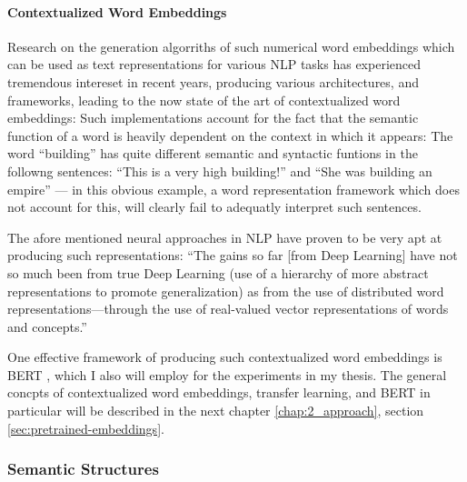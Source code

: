 \paragraph*{Contextualized Word Embeddings}

Research on the generation algorriths of such numerical word embeddings which can
be used as text representations for various NLP tasks has experienced tremendous
intereset in recent years, producing various architectures, and frameworks, leading
to the now state of the art of contextualized word embeddings: Such implementations
account for the fact that the semantic function of a word is heavily dependent on
the context in which it appears: The word ``building'' has quite different semantic
and syntactic funtions in the followng sentences: ``This is a very high building!''
and ``She was building an empire'' --- in this obvious example, a word representation
framework which does not account for this, will clearly fail to adequatly interpret
such sentences.

The afore mentioned neural approaches in NLP have proven to be very apt at
producing such representations: ``The gains so far [from Deep Learning] have
not so much been from true Deep Learning (use of a hierarchy of more abstract
representations to promote generalization) as from the use of distributed word
representations—through the use of real-valued vector representations of words
and concepts.'' \citep[p.~703]{manning2015computational}


One effective framework of producing such contextualized word embeddings is BERT \citep{devlin2018bert},
which I also will employ for the experiments in my thesis. The general concpts of contextualized
word embeddings, transfer learning, and BERT in particular will be described in the next chapter
\ref{chap:2_approach}, section \ref{sec:pretrained-embeddings}.


\subsubsection*{Semantic Structures}

